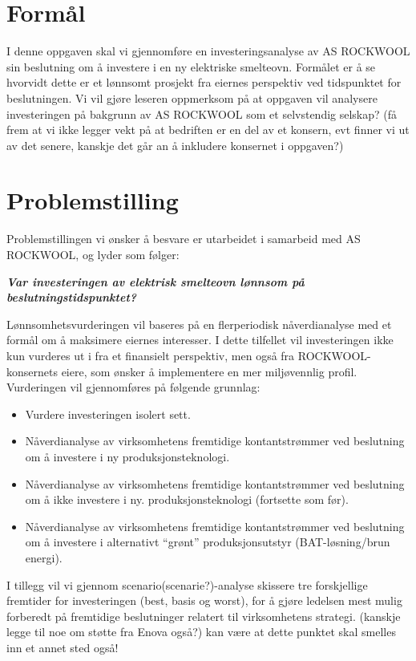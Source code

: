 \section{Formål}
I denne oppgaven skal vi gjennomføre en investeringsanalyse av AS ROCKWOOL sin beslutning om å investere i en ny elektriske smelteovn. Formålet er å se hvorvidt dette er et lønnsomt prosjekt fra eiernes perspektiv ved tidspunktet for beslutningen. Vi vil gjøre leseren oppmerksom på at oppgaven vil analysere investeringen på bakgrunn av AS ROCKWOOL som et selvstendig selskap? (få frem at vi ikke legger vekt på at bedriften er en del av et konsern, evt finner vi ut av det senere, kanskje det går an å inkludere konsernet i oppgaven?)

\section{Problemstilling}
Problemstillingen vi ønsker å besvare er utarbeidet i samarbeid med AS ROCKWOOL, og lyder som følger:

\indent \newline
\textit{\textbf{Var investeringen av elektrisk smelteovn lønnsom på beslutningstidspunktet?}}

\indent \newline
Lønnsomhetsvurderingen vil baseres på en flerperiodisk nåverdianalyse med et formål om å maksimere eiernes interesser. I dette tilfellet vil investeringen ikke kun vurderes ut i fra et finansielt perspektiv, men også fra ROCKWOOL-konsernets eiere, som ønsker å implementere en mer miljøvennlig profil. Vurderingen vil gjennomføres på følgende grunnlag:

\begin{itemize}
\item Vurdere investeringen isolert sett.
\item Nåverdianalyse av virksomhetens fremtidige kontantstrømmer ved beslutning om å investere i ny produksjonsteknologi.
\item Nåverdianalyse av virksomhetens fremtidige kontantstrømmer ved beslutning om å ikke investere i ny. produksjonsteknologi (fortsette som før).
\item Nåverdianalyse av virksomhetens fremtidige kontantstrømmer ved beslutning om å investere i alternativt “grønt” produksjonsutstyr (BAT-løsning/brun energi).
\end{itemize}

\indent \newline
I tillegg vil vi gjennom scenario(scenarie?)-analyse skissere tre forskjellige fremtider for investeringen (best, basis og worst), for å gjøre ledelsen mest mulig forberedt på fremtidige beslutninger relatert til virksomhetens strategi. (kanskje legge til noe om støtte fra Enova også?) kan være at dette punktet skal smelles inn et annet sted også!